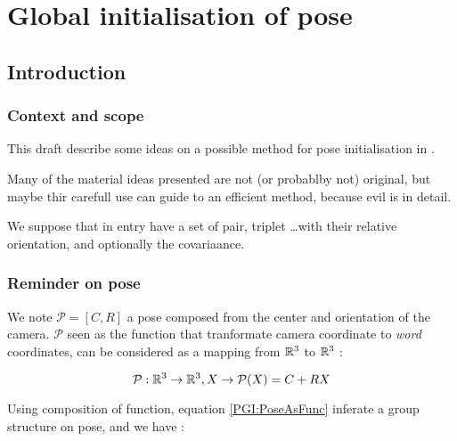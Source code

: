 \chapter{Global initialisation of pose}
\label{Chap:PoseGlobInit}



\section{Introduction}


\subsection{Context and scope}

This draft describe some ideas on a possible method for pose initialisation in \PPP.

Many of the material ideas presented are not (or probablby not) original, but maybe thir carefull use can guide
to an efficient method, because evil is in detail.

We suppose that in entry have a set of pair, triplet \dots with their relative orientation, and
optionally the covariaance.


\subsection{Reminder on pose}

We note $\mathcal{P} = [C,R]$ a pose composed from the center and orientation of the camera.
$\mathcal{P}$ seen as the function that tranformate camera coordinate to \emph{word} coordinates,
 can be considered as a mapping from $\mathbb{R}^3$ to $\mathbb{R}^3$ :

\begin{equation}
   \mathcal{P}  :  \mathbb{R}^3 \rightarrow \mathbb{R}^3,  X \rightarrow \mathcal{P}(X) = C + R X
   \label{PGI:PoseAsFunc}
\end{equation}

Using composition of function, equation \ref{PGI:PoseAsFunc} inferate a group structure on pose, and we have :


